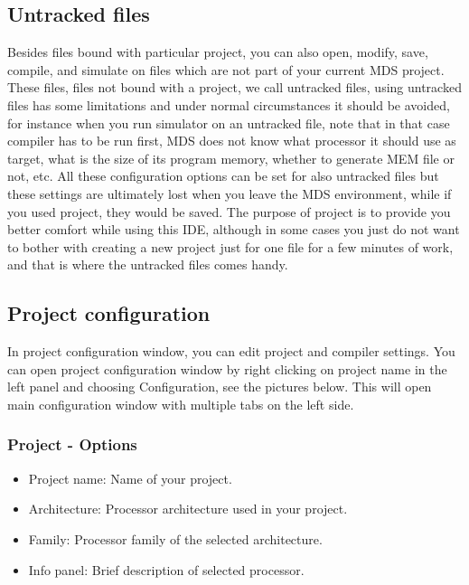     \subsection{Untracked files}
        Besides files bound with particular project, you can also open, modify, save, compile, and simulate on files which are not part of your current MDS project. These files, files not bound with a project, we call untracked files, using untracked files has some limitations and under normal circumstances it should be avoided, for instance when you run simulator on an untracked file, note that in that case compiler has to be run first, MDS does not know what processor it should use as target, what is the size of its program memory, whether to generate MEM file or not, etc. All these configuration options can be set for also untracked files but these settings are ultimately lost when you leave the MDS environment, while if you used project, they would be saved. The purpose of project is to provide you better comfort while using this IDE, although in some cases you just do not want to bother with creating a new project just for one file for a few minutes of work, and that is where the untracked files comes 
handy.

    \clearpage
    \subsection{Project configuration}
        In project configuration window, you can edit project and compiler settings. You can open project configuration
        window by right clicking on project name in the left panel and choosing Configuration, see the pictures below.
        This will open main configuration window with multiple tabs on the left side.

        \subsubsection{Project - Options}
            \begin{itemize}
                \item Project name: Name of your project.
                \item Architecture: Processor architecture used in your project.
                \item Family: Processor family of the selected architecture.
                \item Info panel: Brief description of selected processor.
            \end{itemize}

